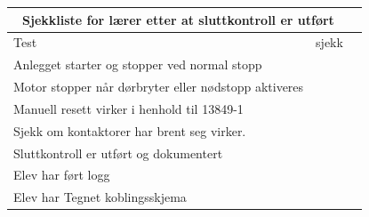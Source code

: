 \begin{center}
\begin{tabular}{ | m{8cm} | m{1cm}| m{2cm} | } 
\hline
\multicolumn{2}{|c|}{Sjekkliste for lærer etter at sluttkontroll er utført} \\
\hline
Test	& sjekk \\ 
\hline
\hline

	Anlegget starter og stopper ved normal stopp &\\
	
	\hline
	Motor stopper når dørbryter eller nødstopp aktiveres&\\
	\hline
	Manuell resett virker i henhold til 13849-1 &\\
	\hline
	Sjekk om kontaktorer har brent seg virker. &\\
	\hline
	Sluttkontroll er utført og dokumentert &\\
	\hline
	Elev har ført logg &\\
	\hline
	Elev har Tegnet koblingsskjema &\\
	\hline

\end{tabular}
\end{center}
\vskip 10pt 






























